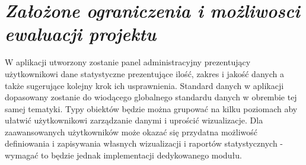 \documentclass[a4paper,12pt]{report}
\newcommand{\customstylechapter}[1]{\large{\textit{#1}}}
\begin{document}
\chapter{\customstylechapter{Założone ograniczenia i możliwosci ewaluacji projektu}}
W aplikacji utworzony zostanie panel administracyjny prezentujący użytkownikowi 
dane statystyczne prezentujące ilość, zakres i jakość danych a także sugerujące 
kolejny krok ich usprawnienia. Standard danych w aplikacji dopasowany zostanie 
do wiodącego globalnego standardu danych w obrembie tej samej tematyki. Typy 
obiektów będzie można grupować na kilku poziomach aby ułatwić użytkownikowi 
zarządzanie danymi i uprościć wizualizacje. Dla zaawansowanych użytkowników 
może okazać się przydatna możliwość definiowania i zapisywania własnych 
wizualizacji i raportów statystycznych - wymagać to będzie jednak implementacji 
dedykowanego modułu.
\end{document}
